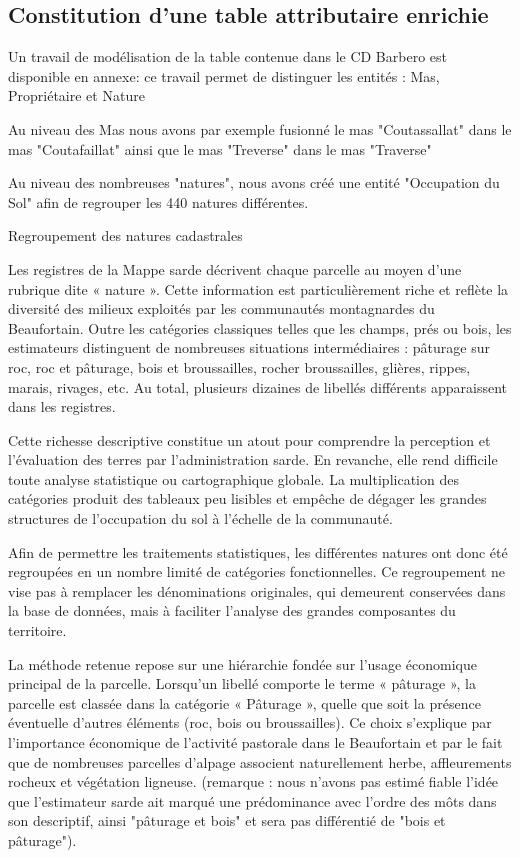 \subsection{Constitution d’une table attributaire enrichie}

Un travail de modélisation de la table contenue dans le CD Barbero est disponible en annexe: ce travail permet de distinguer les entités : Mas, Propriétaire et Nature

Au niveau des Mas nous avons par exemple fusionné le mas "Coutassallat" dans le mas "Coutafaillat" ainsi que le mas "Treverse" dans le mas "Traverse"

Au niveau des nombreuses "natures", nous avons créé une entité "Occupation du Sol" afin de regrouper les 440 natures différentes.

Regroupement des natures cadastrales

Les registres de la Mappe sarde décrivent chaque parcelle au moyen d'une rubrique dite « nature ». Cette information est particulièrement riche et reflète la diversité des milieux exploités par les communautés montagnardes du Beaufortain. Outre les catégories classiques telles que les champs, prés ou bois, les estimateurs distinguent de nombreuses situations intermédiaires : pâturage sur roc, roc et pâturage, bois et broussailles, rocher broussailles, glières, rippes, marais, rivages, etc. Au total, plusieurs dizaines de libellés différents apparaissent dans les registres.

Cette richesse descriptive constitue un atout pour comprendre la perception et l'évaluation des terres par l'administration sarde. En revanche, elle rend difficile toute analyse statistique ou cartographique globale. La multiplication des catégories produit des tableaux peu lisibles et empêche de dégager les grandes structures de l'occupation du sol à l'échelle de la communauté.

Afin de permettre les traitements statistiques, les différentes natures ont donc été regroupées en un nombre limité de catégories fonctionnelles. Ce regroupement ne vise pas à remplacer les dénominations originales, qui demeurent conservées dans la base de données, mais à faciliter l'analyse des grandes composantes du territoire.

La méthode retenue repose sur une hiérarchie fondée sur l'usage économique principal de la parcelle. Lorsqu'un libellé comporte le terme « pâturage », la parcelle est classée dans la catégorie « Pâturage », quelle que soit la présence éventuelle d'autres éléments (roc, bois ou broussailles). Ce choix s'explique par l'importance économique de l'activité pastorale dans le Beaufortain et par le fait que de nombreuses parcelles d'alpage associent naturellement herbe, affleurements rocheux et végétation ligneuse. (remarque : nous n'avons pas estimé fiable l'idée que l'estimateur sarde ait marqué une prédominance avec l'ordre des môts dans son descriptif, ainsi "pâturage et bois" et sera pas différentié de "bois et pâturage").

